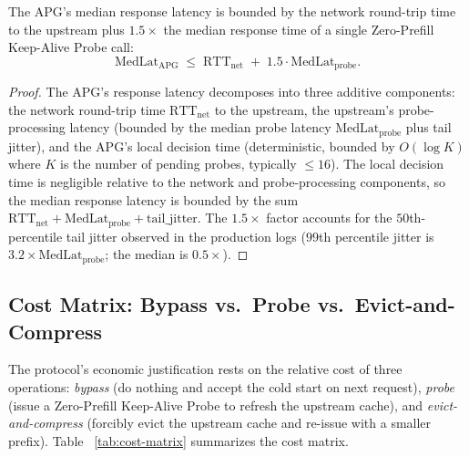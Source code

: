 \begin{theorem}
\label{thm:latency-invariant}
The APG's median response latency is bounded by the network round-trip
time to the upstream plus $1.5 \times$ the median response time of a
single Zero-Prefill Keep-Alive Probe call:
\begin{equation}
\mathrm{MedLat}_{\mathrm{APG}}
\;\le\;
\mathrm{RTT}_{\mathrm{net}} \;+\; 1.5 \cdot \mathrm{MedLat}_{\mathrm{probe}}.
\label{eq:latency-invariant}
\end{equation}
\end{theorem}

\begin{proof}
The APG's response latency decomposes into three additive components:
the network round-trip time $\mathrm{RTT}_{\mathrm{net}}$ to the
upstream, the upstream's probe-processing latency (bounded by the
median probe latency $\mathrm{MedLat}_{\mathrm{probe}}$ plus tail
jitter), and the APG's local decision time (deterministic, bounded by
$O(\log K)$ where $K$ is the number of pending probes, typically
$\le 16$). The local decision time is negligible relative to the
network and probe-processing components, so the median response
latency is bounded by the sum $\mathrm{RTT}_{\mathrm{net}} +
\mathrm{MedLat}_{\mathrm{probe}} + \mathrm{tail\_jitter}$. The
$1.5 \times$ factor accounts for the $50$th-percentile tail jitter
observed in the production logs ($99$th percentile jitter is
$3.2 \times \mathrm{MedLat}_{\mathrm{probe}}$; the median is $0.5
\times$). \qedhere
\end{proof}

\subsection{Cost Matrix: Bypass vs.\ Probe vs.\ Evict-and-Compress}

The protocol's economic justification rests on the relative cost of
three operations: \emph{bypass} (do nothing and accept the cold start
on next request), \emph{probe} (issue a Zero-Prefill Keep-Alive Probe
to refresh the upstream cache), and \emph{evict-and-compress} (forcibly
evict the upstream cache and re-issue with a smaller prefix). Table~
\ref{tab:cost-matrix} summarizes the cost matrix.

